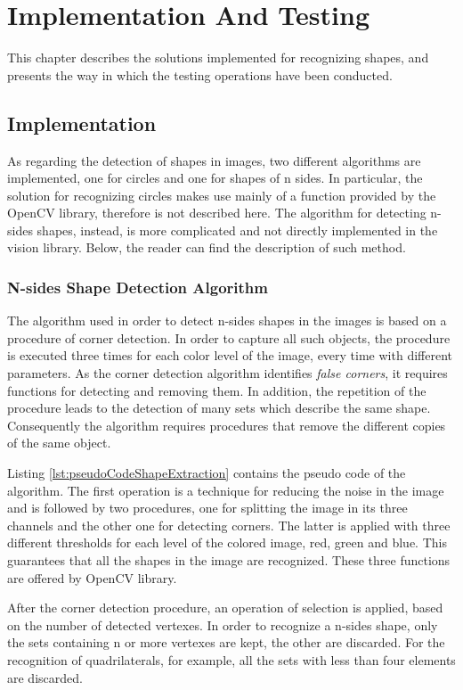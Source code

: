 \chapter{Implementation And Testing}\label{impl_test}
	This chapter describes the solutions implemented for recognizing shapes, and presents the way in which the testing operations have been conducted.
	
	
	\section{Implementation}
		As regarding the detection of shapes in images, two different algorithms are implemented, one for circles and one for shapes of n sides.
		In particular, the solution for recognizing circles makes use mainly of a function provided by the \mbox{OpenCV} library, therefore is not described here.
		The algorithm for detecting n-sides shapes, instead, is more complicated and not directly implemented in the vision library. 
		Below, the reader can find the description of such method.
	
		\subsection{N-sides Shape Detection Algorithm}
		The algorithm used in order to detect n-sides shapes in the images is based on a procedure of corner detection. 
		In order to capture all such objects, the procedure is executed three times for each color level of the image, every time with different parameters.
		As the corner detection algorithm identifies \emph{false corners}, it requires functions for detecting and removing them. 
		In addition, the repetition of the procedure leads to the detection of many sets which describe the same shape.	
		Consequently the algorithm requires procedures that remove the different copies of the same object.


		
		Listing \ref{lst:pseudoCodeShapeExtraction} contains the pseudo code of the algorithm.
		The first operation is a technique for reducing the noise in the image and is followed by two procedures, one for splitting the image in its three channels and the other one for detecting corners.
		The latter is applied with three different thresholds for each level of the colored image, red, green and blue.
		This guarantees that all the shapes in the image are recognized.
		These three functions are offered by \mbox{OpenCV} library.

		
		After the corner detection procedure, an operation of selection is applied, based on the number of detected vertexes.
		In order to recognize a n-sides shape, only the sets containing n or more vertexes are kept, the other are discarded.
		For the recognition of quadrilaterals, for example, all the sets with less than four elements are discarded.
		
